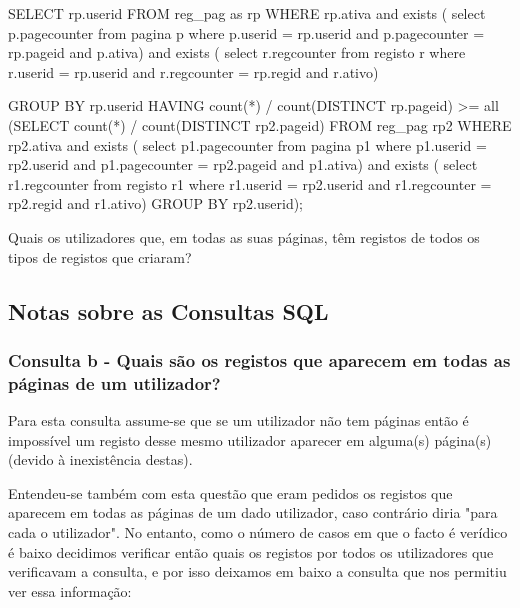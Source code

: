 \documentclass[11pt,a4paper]{article}
\begin{document}
\begin{enumerate}[label=(\alph*)]
\begin{minipage}{\textwidth}
		\begin{code}[language=SQL]
SELECT rp.userid
FROM reg_pag as rp
WHERE rp.ativa and 
	exists (
		select p.pagecounter 
		from pagina p
		where 	p.userid = rp.userid and
			p.pagecounter = rp.pageid and
			p.ativa) and
	exists (
		select r.regcounter
		from registo r
		where	r.userid = rp.userid and
			r.regcounter = rp.regid and
			r.ativo)
			
GROUP BY rp.userid
HAVING count(*) / count(DISTINCT rp.pageid) >= all
    (SELECT count(*) / count(DISTINCT rp2.pageid)
     FROM reg_pag rp2
     WHERE rp2.ativa and 
		exists (
			select p1.pagecounter 
			from pagina p1
			where 	p1.userid = rp2.userid and
				p1.pagecounter = rp2.pageid and
				p1.ativa) and
		exists (
			select r1.regcounter
			from registo r1
			where	r1.userid = rp2.userid and
				r1.regcounter = rp2.regid and
				r1.ativo)
	     GROUP BY rp2.userid);
		\end{code}
\end{minipage}
\begin{minipage}{\textwidth}
	\item Quais os utilizadores que, em todas as suas páginas, têm registos de todos os tipos de registos que criaram?
	
\begin{code}[language=SQL]

\end{code}
	
\end{minipage}
\end{enumerate}

\subsection{Notas sobre as Consultas SQL}
\subsubsection{Consulta b -  Quais são os registos que aparecem em todas as páginas de um utilizador?}
Para esta consulta assume-se que se um utilizador não tem páginas então é impossível um registo desse mesmo utilizador aparecer em alguma(s) página(s) (devido à inexistência destas).

Entendeu-se também com esta questão que eram pedidos os registos que aparecem em todas as páginas de um dado utilizador, caso contrário diria "para cada o utilizador". No entanto, como o número de casos em que o facto é verídico é baixo decidimos verificar então quais os registos por todos os utilizadores que verificavam a consulta, e por isso deixamos em baixo a consulta que nos permitiu ver essa informação:
\end{document}
